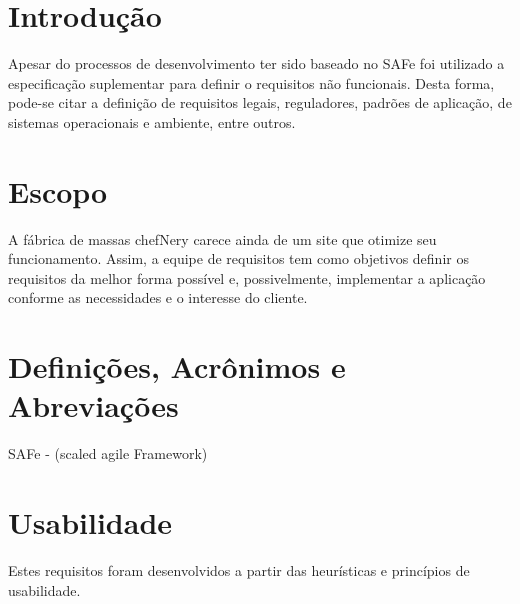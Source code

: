 \begin{apendicesenv}
{\large {\section { Introdução \\ } } }

Apesar do processos de desenvolvimento ter sido baseado no SAFe foi utilizado a especificação suplementar para definir o requisitos não funcionais. Desta forma, pode-se citar a definição de requisitos legais, reguladores, padrões de aplicação, de sistemas operacionais e ambiente, entre outros.

{\large {\section { Escopo \\ } } }

A fábrica de massas chefNery carece ainda de um site que otimize seu funcionamento. Assim, a equipe de requisitos tem como objetivos definir os requisitos da melhor forma possível e, possivelmente, implementar a aplicação conforme as necessidades e o interesse do cliente. 

{\large {\section { Definições, Acrônimos e Abreviações \\ } } }

SAFe - (scaled agile Framework)

{\large {\section { Usabilidade \\ } } }

Estes requisitos foram desenvolvidos a partir das heurísticas e princípios de usabilidade. 



\end{apendicesenv}
